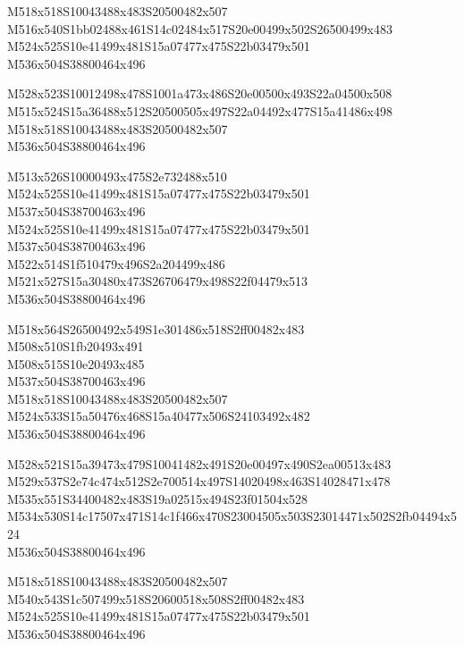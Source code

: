 \documentclass{article}
\begin{document}
\begin{multicols}{5}
\begin{center}

M518x518S10043488x483S20500482x507 %
\\M516x540S1bb02488x461S14c02484x517S20e00499x502S26500499x483 %
\\M524x525S10e41499x481S15a07477x475S22b03479x501 %
\\M536x504S38800464x496 %

M528x523S10012498x478S1001a473x486S20e00500x493S22a04500x508 %
\\M515x524S15a36488x512S20500505x497S22a04492x477S15a41486x498 %
\\M518x518S10043488x483S20500482x507 %
\\M536x504S38800464x496 %

M513x526S10000493x475S2e732488x510 %
\\M524x525S10e41499x481S15a07477x475S22b03479x501 %
\\M537x504S38700463x496 %
\\M524x525S10e41499x481S15a07477x475S22b03479x501 %
\\M537x504S38700463x496 %
\\M522x514S1f510479x496S2a204499x486 %
\\M521x527S15a30480x473S26706479x498S22f04479x513 %
\\M536x504S38800464x496 %

M518x564S26500492x549S1e301486x518S2ff00482x483 %
\\M508x510S1fb20493x491 %
\\M508x515S10e20493x485 %
\\M537x504S38700463x496 %
\\M518x518S10043488x483S20500482x507 %
\\M524x533S15a50476x468S15a40477x506S24103492x482 %
\\M536x504S38800464x496 %

M528x521S15a39473x479S10041482x491S20e00497x490S2ea00513x483 %
\\M529x537S2e74c474x512S2e700514x497S14020498x463S14028471x478 %
\\M535x551S34400482x483S19a02515x494S23f01504x528 %
\\M534x530S14c17507x471S14c1f466x470S23004505x503S23014471x502S2fb04494x524 %
\\M536x504S38800464x496 %

M518x518S10043488x483S20500482x507 %
\\M540x543S1c507499x518S20600518x508S2ff00482x483 %
\\M524x525S10e41499x481S15a07477x475S22b03479x501 %
\\M536x504S38800464x496 %

\end{center}
\end{multicols}
\end{document}
